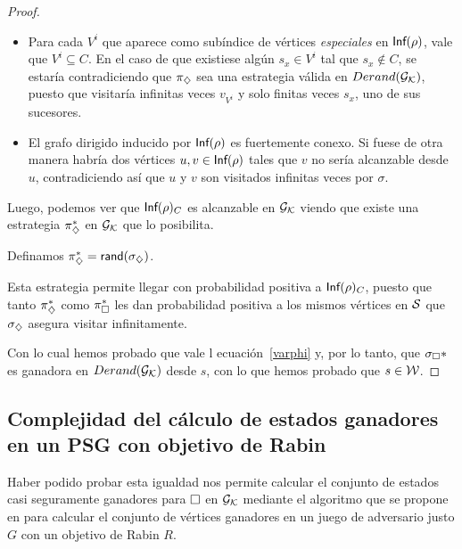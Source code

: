 \begin{proof}

	\begin{itemize}
		\item Para cada $V^i$ que aparece como subíndice de vértices \textit{especiales} en
		      $\textsf{Inf}(\rho)$, vale que $V^i \subseteq C$. En el caso de que existiese algún
		      $s_x \in V^i$ tal que $s_x \notin C$, se estaría contradiciendo que $\pi_\diamondsuit$
		      sea una estrategia válida en $Derand(\mathcal{G}_{\mathcal{K}})$, puesto que visitaría infinitas veces
		      $v_{V^i}$ y solo finitas veces $s_x$, uno de sus sucesores.
		\item El grafo dirigido inducido por $\textsf{Inf}(\rho)$ es fuertemente conexo. Si fuese de
		      otra manera habría dos vértices $u, v \in \textsf{Inf}(\rho)$ tales que $v$ no sería
		      alcanzable desde $u$, contradiciendo así que $u$ y $v$ son visitados infinitas
		      veces por $\sigma$.
	\end{itemize}

	Luego, podemos ver que $\textsf{Inf}(\rho)_C$ es alcanzable en $\mathcal{G}_{\mathcal{K}}$ viendo que existe
	una estrategia $\pi_\diamondsuit^*$ en $\mathcal{G}_{\mathcal{K}}$ que lo posibilita.

	Definamos $\pi_\diamondsuit^* = \textsf{rand}(\sigma_\diamondsuit)$.

	Esta estrategia permite llegar con probabilidad positiva a $\textsf{Inf}(\rho)_C$,
	puesto que tanto $\pi_\diamondsuit^*$ como $\pi_\square^*$ les dan probabilidad positiva a
	los mismos vértices en $\mathcal{S}$ que $\sigma_\diamondsuit$ asegura visitar infinitamente.

	Con lo cual hemos probado que vale l ecuación~\ref{varphi} y, por lo tanto, que
	$\sigma_\square*$ es ganadora en $Derand(\mathcal{G}_{\mathcal{K}})$ desde $s$, con lo que hemos probado que
	$s \in \mathcal{W}$.

\end{proof}

\subsection*{Complejidad del cálculo de estados ganadores en un PSG con objetivo de Rabin}

Haber podido probar esta igualdad nos permite calcular el conjunto de estados
casi seguramente ganadores para $\square$ en $\mathcal{G}_{\mathcal{K}}$ mediante el algoritmo que se
propone en \cite{Banerjee} para calcular el conjunto de vértices ganadores en
un juego de adversario justo $G$ con un objetivo de Rabin $R$.

